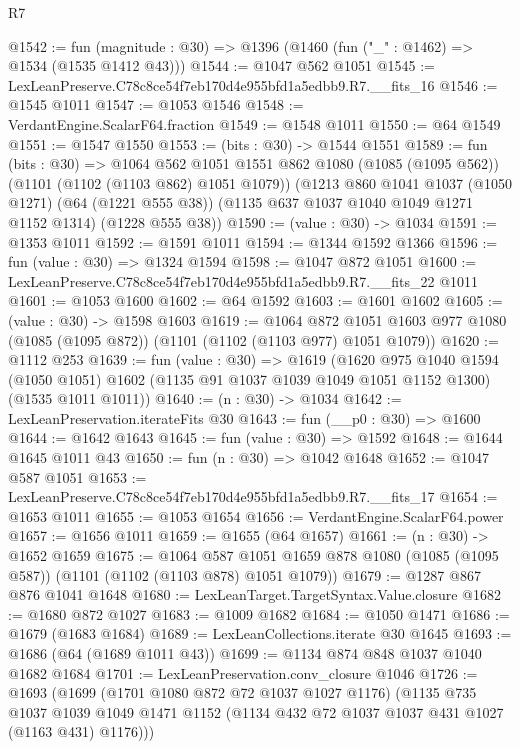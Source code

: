 \begin{lexlean}{R7}
\begin{coremodule}
@1542 := fun (magnitude : @30) => @1396 (@1460 (fun ("_" : @1462) => @1534 (@1535 @1412 @43)))
@1544 := @1047 @562 @1051
@1545 := LexLeanPreserve.C78c8ce54f7eb170d4e955bfd1a5edbb9.R7.__fits_16
@1546 := @1545 @1011
@1547 := @1053 @1546
@1548 := VerdantEngine.ScalarF64.fraction
@1549 := @1548 @1011
@1550 := @64 @1549
@1551 := @1547 @1550
@1553 := (bits : @30) -> @1544 @1551
@1589 := fun (bits : @30) =>
  @1064
    @562
    @1051
    @1551
    @862
    @1080
    (@1085 (@1095 @562))
    (@1101 (@1102 (@1103 @862) @1051 @1079))
    (@1213
      @860
      @1041
      @1037
      (@1050 @1271)
      (@64 (@1221 @555 @38))
      (@1135 @637 @1037 @1040 @1049 @1271 @1152 @1314)
      (@1228 @555 @38))
@1590 := (value : @30) -> @1034
@1591 := @1353 @1011
@1592 := @1591 @1011
@1594 := @1344 @1592 @1366
@1596 := fun (value : @30) => @1324 @1594
@1598 := @1047 @872 @1051
@1600 := LexLeanPreserve.C78c8ce54f7eb170d4e955bfd1a5edbb9.R7.__fits_22 @1011
@1601 := @1053 @1600
@1602 := @64 @1592
@1603 := @1601 @1602
@1605 := (value : @30) -> @1598 @1603
@1619 := @1064
    @872
    @1051
    @1603
    @977
    @1080
    (@1085 (@1095 @872))
    (@1101 (@1102 (@1103 @977) @1051 @1079))
@1620 := @1112 @253
@1639 := fun (value : @30) =>
  @1619
    (@1620
      @975
      @1040
      @1594
      (@1050 @1051)
      @1602
      (@1135 @91 @1037 @1039 @1049 @1051 @1152 @1300)
      (@1535 @1011 @1011))
@1640 := (n : @30) -> @1034
@1642 := LexLeanPreservation.iterateFits @30
@1643 := fun (__p0 : @30) => @1600
@1644 := @1642 @1643
@1645 := fun (value : @30) => @1592
@1648 := @1644 @1645 @1011 @43
@1650 := fun (n : @30) => @1042 @1648
@1652 := @1047 @587 @1051
@1653 := LexLeanPreserve.C78c8ce54f7eb170d4e955bfd1a5edbb9.R7.__fits_17
@1654 := @1653 @1011
@1655 := @1053 @1654
@1656 := VerdantEngine.ScalarF64.power
@1657 := @1656 @1011
@1659 := @1655 (@64 @1657)
@1661 := (n : @30) -> @1652 @1659
@1675 := @1064
    @587
    @1051
    @1659
    @878
    @1080
    (@1085 (@1095 @587))
    (@1101 (@1102 (@1103 @878) @1051 @1079))
@1679 := @1287 @867 @876 @1041 @1648
@1680 := LexLeanTarget.TargetSyntax.Value.closure
@1682 := @1680 @872 @1027
@1683 := @1009 @1682
@1684 := @1050 @1471
@1686 := @1679 (@1683 @1684)
@1689 := LexLeanCollections.iterate @30 @1645
@1693 := @1686 (@64 (@1689 @1011 @43))
@1699 := @1134 @874 @848 @1037 @1040 @1682 @1684
@1701 := LexLeanPreservation.conv_closure @1046
@1726 := @1693
    (@1699
      (@1701 @1080 @872 @72 @1037 @1027 @1176)
      (@1135
        @735
        @1037
        @1039
        @1049
        @1471
        @1152
        (@1134 @432 @72 @1037 @1037 @431 @1027 (@1163 @431) @1176)))

\end{coremodule}
\end{lexlean}

